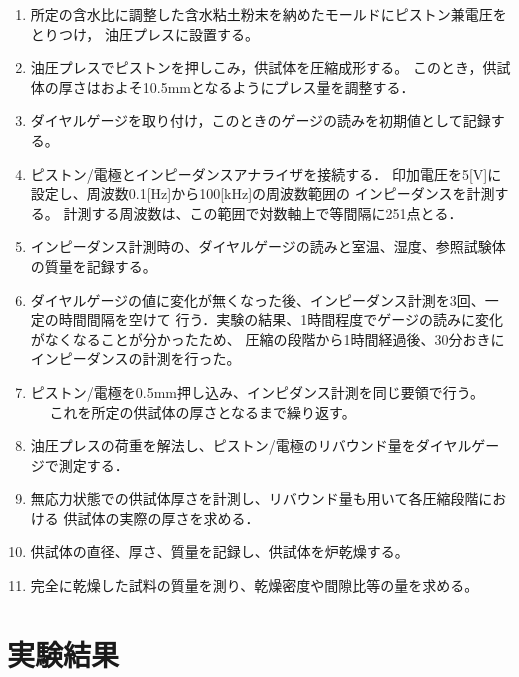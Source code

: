 \begin{enumerate}
\item
	所定の含水比に調整した含水粘土粉末を納めたモールドにピストン兼電圧をとりつけ，
	油圧プレスに設置する。
\item
	油圧プレスでピストンを押しこみ，供試体を圧縮成形する。
	このとき，供試体の厚さはおよそ10.5mmとなるようにプレス量を調整する．
\item
	ダイヤルゲージを取り付け，このときのゲージの読みを初期値として記録する。
\item
	ピストン/電極とインピーダンスアナライザを接続する．
	印加電圧を5[V]に設定し、周波数0.1[Hz]から100[kHz]の周波数範囲の
	インピーダンスを計測する。
	計測する周波数は、この範囲で対数軸上で等間隔に251点とる．
\item
	インピーダンス計測時の、ダイヤルゲージの読みと室温、湿度、参照試験体の質量を記録する。
\item
	ダイヤルゲージの値に変化が無くなった後、インピーダンス計測を3回、一定の時間間隔を空けて
	行う．実験の結果、1時間程度でゲージの読みに変化がなくなることが分かったため、
	圧縮の段階から1時間経過後、30分おきにインピーダンスの計測を行った。
\item
	ピストン/電極を0.5mm押し込み、インピダンス計測を同じ要領で行う。
　	これを所定の供試体の厚さとなるまで繰り返す。
\item
	油圧プレスの荷重を解法し、ピストン/電極のリバウンド量をダイヤルゲージで測定する．
\item
	無応力状態での供試体厚さを計測し、リバウンド量も用いて各圧縮段階における
	供試体の実際の厚さを求める．
\item
	供試体の直径、厚さ、質量を記録し、供試体を炉乾燥する。
\item
	完全に乾燥した試料の質量を測り、乾燥密度や間隙比等の量を求める。		
\end{enumerate}\section{実験結果}

